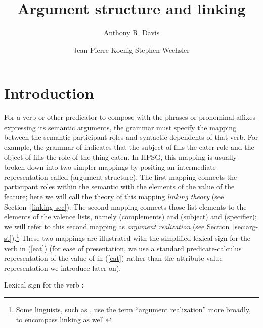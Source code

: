 \documentclass[output=paper
 	        ,biblatex
                ,babelshorthands
                ,newtxmath
                ,draftmode
                ,colorlinks, citecolor=brown
]{langscibook}
\author{%
	Anthony R. Davis\affiliation{Southern Oregon University}%
	\and Jean-Pierre Koenig\affiliation{University at Buffalo}%
	\lastand Stephen Wechsler\affiliation{The University of Texas}%
}
\title{Argument structure and linking}
\begin{document}
\maketitle
\label{chap:argumentstr}\label{chap-argumentstr}\label{chap-arg-st}

\section{Introduction}


For a verb or other predicator to compose with the phrases or pronominal affixes expressing its
semantic arguments, the grammar must specify the mapping between the semantic participant
roles and syntactic dependents
of that verb.  For example, the grammar of  indicates that the subject of 
fills the eater role and the object of   fills the role of the thing eaten.  In HPSG, this
mapping is usually broken down into two simpler mappings by positing an intermediate representation
called \argst (argument structure).  The first mapping connects the participant roles within the
semantic \content with the elements of the value of the \argst feature; here we will call the theory
of this mapping \emph{linking theory} (see Section~\ref{linking-sec}).  The second mapping connects
those \argst list elements to the elements of the valence lists, namely \comps
(complements) and \subj (subject) and  \spr (specifier); we will refer to this second mapping as
\emph{argument realization} (see Section~\ref{sec:arg-st}).\footnote{Some linguists, such as
  \citet{LevinandRappaport2005}, use the term ``argument realization'' more broadly, to encompass
  linking as well.}  
These two mappings are
illustrated with the simplified lexical sign for the verb  in (\ref{eat}) (for ease of
presentation, we use a standard predicate-calculus representation of the value of \content in
(\ref{eat}) rather than the attribute-value representation we introduce later on).  


\ea
\label{eat}
Lexical sign for the verb :\\
\z
\end{document}
